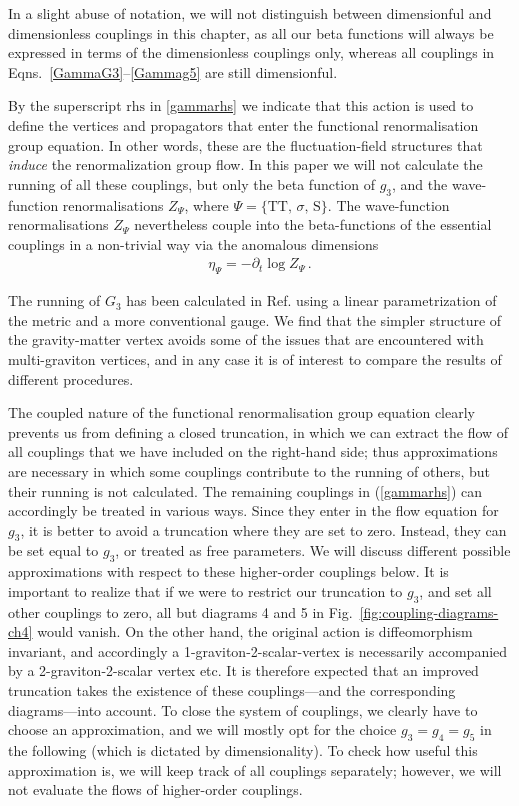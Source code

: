 \documentclass[11pt]{book}
\numberwithin{equation}{chapter}
\begin{document}
In a slight abuse of notation, we will not distinguish between dimensionful and dimensionless couplings in
this chapter,
as all our beta functions will always be expressed in terms of the dimensionless couplings only,
whereas all couplings in Eqns.~\eqref{GammaG3}--\eqref{Gammag5} are still dimensionful.

By the superscript $\mathrm{rhs}$ in \eqref{gammarhs} we indicate that this action is used to define the
vertices and propagators that enter the functional renormalisation group equation.
In other words, these are the fluctuation-field structures that \emph{induce} the renormalization group flow.
In this paper we will not calculate the running of all these couplings, but only the beta function
of $g_3$, and the wave-function renormalisations $Z_\Psi$, where $\Psi = \{ \mathrm{TT}, \, \sigma, \, \mathrm S \}$.
The wave-function renormalisations $Z_\Psi$ nevertheless couple into the beta-functions of the
essential couplings in a non-trivial way via the anomalous dimensions
\begin{align}
  \eta_\Psi = - \partial_t \log Z_\Psi \,.
\end{align}

The running of $G_3$ has been calculated in Ref. \cite{Meibohm:2015twa} using a linear
parametrization of the metric and a more conventional gauge.
We find that the simpler structure of the gravity-matter vertex avoids some of the issues that
are encountered with multi-graviton vertices,
and in any case it is of interest to compare the results of different procedures.

The coupled nature of the functional renormalisation group equation clearly prevents
us from defining a closed truncation,
in which we can extract the flow of all couplings that we have included on the right-hand side;
thus approximations are necessary in which some couplings contribute to the running of others,
but their running is not calculated.
The remaining couplings in (\ref{gammarhs}) can accordingly be treated in various ways.
Since they enter in the flow equation for $g_3$,
it is better to avoid a truncation where they are set to zero.
Instead, they can be set equal to $g_3$, or treated as free parameters.
We will discuss different possible approximations with respect to these higher-order couplings below.
It is important to realize that if we were to restrict our truncation to $g_3$,
and set all other couplings to zero,
all but diagrams 4 and 5 in Fig.~\ref{fig:coupling-diagrams-ch4} would vanish.
On the other hand, the original action is diffeomorphism invariant,
and accordingly a 1-graviton-2-scalar-vertex is necessarily accompanied by a 2-graviton-2-scalar vertex etc.
It is therefore expected that an improved truncation takes the existence of these couplings---and
the corresponding diagrams---into account.
To close the system of couplings, we clearly have to choose an approximation,
and we will mostly opt for the choice $g_3=g_4=g_5$ in the following
(which is dictated by dimensionality). To check how useful this approximation is,
we will keep track of all couplings separately;
however, we will not evaluate the flows of higher-order couplings.
\end{document}
